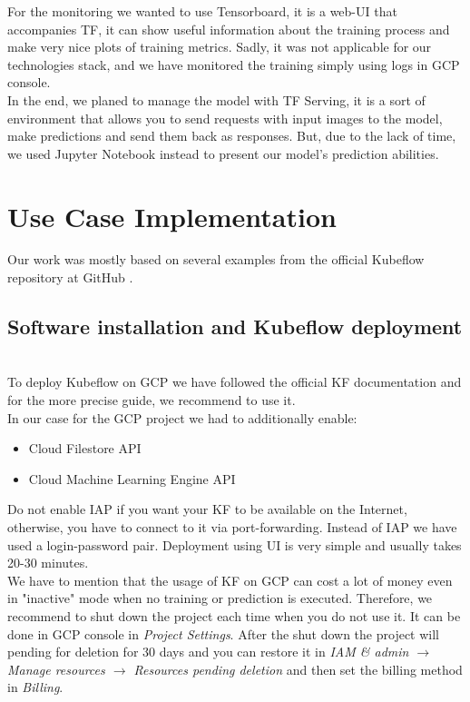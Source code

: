 \documentclass[
	12pt, %
]{fphw}
\begin{document}
For the monitoring we wanted to use Tensorboard, it is a web-UI that accompanies TF, it can show useful information about the training process and make very nice plots of training metrics. Sadly, it was not applicable for our technologies stack, and we have monitored the training simply using logs in GCP console. \\

In the end, we planed to manage the model with TF Serving, it is a sort of environment that allows you to send requests with input images to the model, make predictions and send them back as responses. But, due to the lack of time, we used Jupyter Notebook instead to present our model's prediction abilities.
\ \\
\pagebreak
\section{Use Case Implementation}

Our work was mostly based on several examples from the official Kubeflow repository at GitHub \cite{kf_examples}. 

\subsection*{Software installation and Kubeflow deployment}
\ \\ 

To deploy Kubeflow on GCP we have followed the official KF documentation \cite{kf_on_gcp} and for the more precise guide, we recommend to use it.\\

In our case for the GCP project we had to additionally enable:
\begin{itemize}
	\item Cloud Filestore API
	\item Cloud Machine Learning Engine API
\end{itemize}

Do not enable IAP if you want your KF to be available on the Internet, otherwise, you have to connect to it via port-forwarding. Instead of IAP we have used a login-password pair. Deployment using UI is very simple and usually takes 20-30 minutes.\\

We have to mention that the usage of KF on GCP can cost a lot of money even in "inactive" mode when no training or prediction is executed. Therefore, we recommend to shut down the project each time when you do not use it. It can be done in GCP console in \textit{Project Settings}. After the shut down the project will pending for deletion for 30 days and you can restore it in \textit{IAM \& admin $\rightarrow$ Manage resources $\rightarrow$ Resources pending deletion} and then set the billing method in \textit{Billing}. \\
\end{document}
